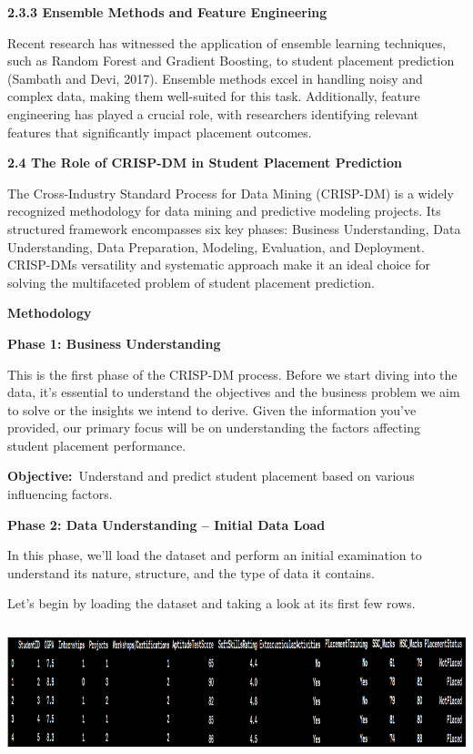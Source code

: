 \documentclass[]{article}
\newcommand{\textcenter}[1]{\begin{center} \vspace{10px}\textbf{\large #1} \end{center}}
\begin{document}
\textbf{2.3.3 Ensemble Methods and Feature Engineering}

Recent research has witnessed the application of ensemble learning
techniques, such as Random Forest and Gradient Boosting, to student
placement prediction (Sambath and Devi, 2017). Ensemble methods excel in
handling noisy and complex data, making them well-suited for this task.
Additionally, feature engineering has played a crucial role, with
researchers identifying relevant features that significantly impact
placement outcomes.

\textbf{2.4 The Role of CRISP-DM in Student Placement Prediction}

The Cross-Industry Standard Process for Data Mining (CRISP-DM) is a
widely recognized methodology for data mining and predictive modeling
projects. Its structured framework encompasses six key phases: Business
Understanding, Data Understanding, Data Preparation, Modeling,
Evaluation, and Deployment. CRISP-DM\textquotesingle s versatility and
systematic approach make it an ideal choice for solving the multifaceted
problem of student placement prediction.

\textcenter{\large Methodology}

\textcenter{Phase 1: Business Understanding}

This is the first phase of the CRISP-DM process. Before we start diving
into the data, it's essential to understand the objectives and the
business problem we aim to solve or the insights we intend to derive.
Given the information you've provided, our primary focus will be on
understanding the factors affecting student placement performance.

\textbf{Objective:}~Understand and predict student placement based on
various influencing factors.

\textcenter{Phase 2: Data Understanding -- Initial Data Load}

In this phase, we'll load the dataset and perform an initial examination
to understand its nature, structure, and the type of data it contains.

Let's begin by loading the dataset and taking a look at its first few
rows.

\includegraphics[width=5.26806in,height=1.50417in]{image1.png}
\end{document}
